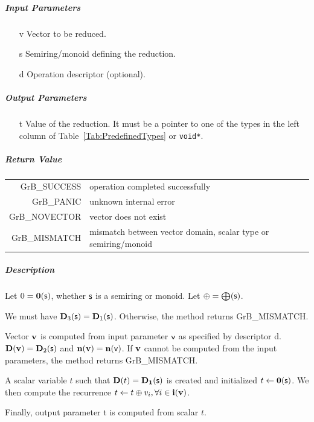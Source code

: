 \documentclass[11pt]{extarticle}
\begin{document}
\subparagraph{Input Parameters}

\begin{itemize}
	\item[{\sf v}] Vector to be reduced.
	\item[{\sf s}] Semiring/monoid defining the reduction.
	\item[{\sf d}] Operation descriptor (optional).
\end{itemize}

\subparagraph{Output Parameters}

\begin{itemize}
	\item[{\sf t}] Value of the reduction. It must
	be a pointer to one of the types in 
	the left column of Table~\ref{Tab:PredefinedTypes} or
	{\tt void*}.
\end{itemize}

\subparagraph{Return Value}

\begin{tabular}{rl}
{\sf GrB\_SUCCESS}	& operation completed successfully \\
{\sf GrB\_PANIC}	& unknown internal error \\
{\sf GrB\_NOVECTOR}	& vector does not exist \\
{\sf GrB\_MISMATCH}	& mismatch between vector domain, scalar type or semiring/monoid \\
\end{tabular}

\subparagraph{Description}

Let $0 = \bold{0}({\sf s})$, whether ${\sf s}$ is a semiring or monoid.
Let $\oplus = \bigoplus({\sf s})$.

We must have $\bold{D}_3({\sf s}) = \bold{D}_1({\sf s})$.
Otherwise, the method returns {\sf GrB\_MISMATCH}.

Vector ${\bf v}$ is computed from input parameter ${\sf v}$ as
specified by descriptor {\sf d}. $\bold{D}({\bf v}) = \bold{D}_2({\sf s})$
and $\bold{n}({\bf v}) = \bold{n}({\sf v})$. If ${\bf v}$ cannot be computed
from the input parameters, the method returns {\sf GrB\_MISMATCH}.

A scalar variable $t$ such that $\bold{D}(t) = \bold{D_1}({\sf s})$ is
created and initialized $t \leftarrow \bold{0}({\sf s})$. 
We then compute the recurrence $t \leftarrow t \oplus v_i, \forall i \in {\bf i}({\bf v})$.

Finally, output parameter {\sf t} is computed from scalar $t$.
\end{document}
